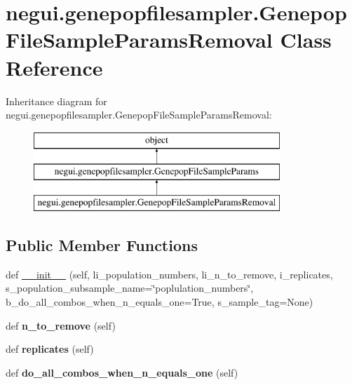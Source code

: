 \hypertarget{classnegui_1_1genepopfilesampler_1_1GenepopFileSampleParamsRemoval}{}\section{negui.\+genepopfilesampler.\+Genepop\+File\+Sample\+Params\+Removal Class Reference}
\label{classnegui_1_1genepopfilesampler_1_1GenepopFileSampleParamsRemoval}
Inheritance diagram for negui.\+genepopfilesampler.\+Genepop\+File\+Sample\+Params\+Removal\+:\begin{figure}[H]
\begin{center}
\leavevmode
\includegraphics[height=3.000000cm]{classnegui_1_1genepopfilesampler_1_1GenepopFileSampleParamsRemoval}
\end{center}
\end{figure}
\subsection*{Public Member Functions}
\begin{DoxyCompactItemize}
\item 
def \hyperlink{classnegui_1_1genepopfilesampler_1_1GenepopFileSampleParamsRemoval_a86cda39f36fb83a858b926706e2c2769}{\+\_\+\+\_\+init\+\_\+\+\_\+} (self, li\+\_\+population\+\_\+numbers, li\+\_\+n\+\_\+to\+\_\+remove, i\+\_\+replicates, s\+\_\+population\+\_\+subsample\+\_\+name=\char`\"{}poplulation\+\_\+numbers\char`\"{}, b\+\_\+do\+\_\+all\+\_\+combos\+\_\+when\+\_\+n\+\_\+equals\+\_\+one=True, s\+\_\+sample\+\_\+tag=None)
\item 
def {\bfseries n\+\_\+to\+\_\+remove} (self)\hypertarget{classnegui_1_1genepopfilesampler_1_1GenepopFileSampleParamsRemoval_a7621d89a31284b0d6d8b49598eb1860d}{}\label{classnegui_1_1genepopfilesampler_1_1GenepopFileSampleParamsRemoval_a7621d89a31284b0d6d8b49598eb1860d}

\item 
def {\bfseries replicates} (self)\hypertarget{classnegui_1_1genepopfilesampler_1_1GenepopFileSampleParamsRemoval_a78561df77c45519715a9dd14bdfd23a0}{}\label{classnegui_1_1genepopfilesampler_1_1GenepopFileSampleParamsRemoval_a78561df77c45519715a9dd14bdfd23a0}

\item 
def {\bfseries do\+\_\+all\+\_\+combos\+\_\+when\+\_\+n\+\_\+equals\+\_\+one} (self)\hypertarget{classnegui_1_1genepopfilesampler_1_1GenepopFileSampleParamsRemoval_a6999b2175c9660123c62495ff155ad08}{}\label{classnegui_1_1genepopfilesampler_1_1GenepopFileSampleParamsRemoval_a6999b2175c9660123c62495ff155ad08}

\end{DoxyCompactItemize}


